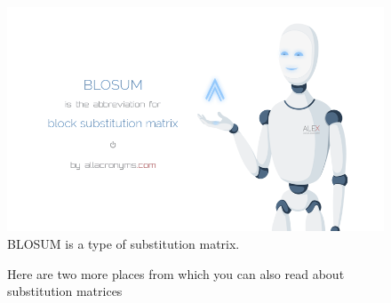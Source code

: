 \documentclass[paper=a4, fontsize=11pt]{scrartcl} %
\numberwithin{equation}{section} %
\numberwithin{figure}{section} %
\numberwithin{table}{section} %
\begin{document}
\begin{figure}[h!]
  \includegraphics[width=\linewidth]{shiny_BLOSUM.png}
 	BLOSUM is a type of substitution matrix. 
  \label{fig:boat1}
\end{figure}
\newpage

\begin{figure}
\hfill
{}
\hfill
{}
\hfill
\caption{Here are two more places from which you can also read about substitution matrices}
\end{figure}





\newpage
\newpage
\end{document}
